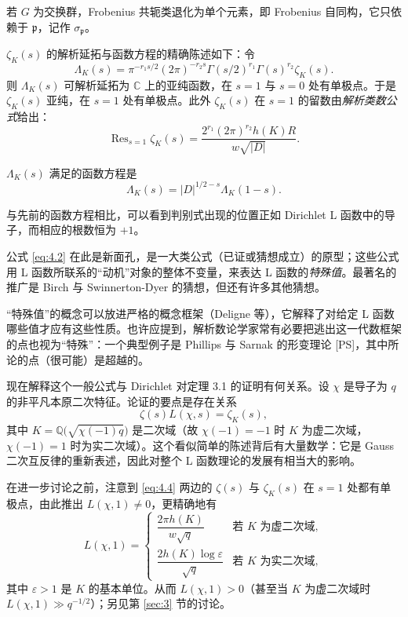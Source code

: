 若 $G$ 为交换群，Frobenius 共轭类退化为单个元素，即 Frobenius 自同构，它只依赖于 $\mathfrak{p}$，记作 $\sigma_{\mathfrak{p}}$。

$\zeta_K(s)$ 的解析延拓与函数方程的精确陈述如下：令
\[
\Lambda_K(s)=\pi^{-r_1s/2}(2\pi)^{-r_2s}
\Gamma(s/2)^{r_1}\Gamma(s)^{r_2}\zeta_K(s).
\]
则 $\Lambda_K(s)$ 可解析延拓为 $\mathbb{C}$ 上的亚纯函数，在 $s=1$ 与 $s=0$ 处有单极点。于是 $\zeta_K(s)$ 亚纯，在 $s=1$ 处有单极点。此外 $\zeta_K(s)$ 在 $s=1$ 的留数由\emph{解析类数公式}给出：
\begin{equation}\tag{4.2}\label{eq:4.2}
\operatorname{Res}_{s=1}\zeta_K(s)=\frac{2^{r_1}(2\pi)^{r_2}h(K)R}{w\sqrt{|D|}}.
\end{equation}

$\Lambda_K(s)$ 满足的函数方程是
\begin{equation}\tag{4.3}\label{eq:4.3}
\Lambda_K(s)=|D|^{1/2-s}\Lambda_K(1-s).
\end{equation}

与先前的函数方程相比，可以看到判别式出现的位置正如 Dirichlet L 函数中的导子，而相应的根数恒为 $+1$。

公式 \eqref{eq:4.2} 在此是新面孔，是一大类公式（已证或猜想成立）的原型；这些公式用 L 函数所联系的“动机”对象的整体不变量，来表达 L 函数的\emph{特殊值}。最著名的推广是 Birch 与 Swinnerton-Dyer 的猜想，但还有许多其他猜想。

“特殊值”的概念可以放进严格的概念框架（Deligne 等），它解释了对给定 L 函数哪些值才应有这些性质。也许应提到，解析数论学家常有必要把逃出这一代数框架的点也视为“特殊”：一个典型例子是 Phillips 与 Sarnak 的形变理论 [PS]，其中所论的点（很可能）是超越的。

现在解释这个一般公式与 Dirichlet 对定理 3.1 的证明有何关系。设 $\chi$ 是导子为 $q$ 的非平凡本原二次特征。论证的要点是存在关系
\begin{equation}\tag{4.4}\label{eq:4.4}
\zeta(s)L(\chi,s)=\zeta_K(s),
\end{equation}
其中 $K=\mathbb{Q}\bigl(\sqrt{\chi(-1)q}\bigr)$ 是二次域（故 $\chi(-1)=-1$ 时 $K$ 为虚二次域，$\chi(-1)=1$ 时为实二次域）。这个看似简单的陈述背后有大量数学：它是 Gauss 二次互反律的重新表述，因此对整个 L 函数理论的发展有相当大的影响。

在进一步讨论之前，注意到 \eqref{eq:4.4} 两边的 $\zeta(s)$ 与 $\zeta_K(s)$ 在 $s=1$ 处都有单极点，由此推出 $L(\chi,1)\neq 0$，更精确地有
\begin{equation}\tag{4.5}\label{eq:4.5}
L(\chi,1)=
\begin{cases}
\dfrac{2\pi h(K)}{w\sqrt{q}} & \text{若 } K \text{ 为虚二次域},\\[2.6mm]
\dfrac{2h(K)\log\varepsilon}{\sqrt{q}} & \text{若 } K \text{ 为实二次域},
\end{cases}
\end{equation}
其中 $\varepsilon>1$ 是 $K$ 的基本单位。从而 $L(\chi,1)>0$（甚至当 $K$ 为虚二次域时 $L(\chi,1)\gg q^{-1/2}$）；另见第 \ref{sec:3} 节的讨论。


